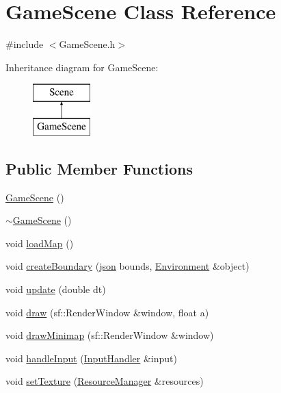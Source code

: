 \hypertarget{class_game_scene}{}\section{Game\+Scene Class Reference}
\label{class_game_scene}


{\ttfamily \#include $<$Game\+Scene.\+h$>$}

Inheritance diagram for Game\+Scene\+:\begin{figure}[H]
\begin{center}
\leavevmode
\includegraphics[height=2.000000cm]{class_game_scene}
\end{center}
\end{figure}
\subsection*{Public Member Functions}
\begin{DoxyCompactItemize}
\item 
\mbox{\hyperlink{class_game_scene_ac53cc300c8896048c0e21c67e49681b9}{Game\+Scene}} ()
\item 
\mbox{\hyperlink{class_game_scene_add5bc48c372aaa7f526c02558a8adf00}{$\sim$\+Game\+Scene}} ()
\item 
void \mbox{\hyperlink{class_game_scene_a0d8a4d922d430c42a6ee0381424ae822}{load\+Map}} ()
\item 
void \mbox{\hyperlink{class_game_scene_ab012fd64f76ebf2c329eee38cb1db5d8}{create\+Boundary}} (\mbox{\hyperlink{_level_loader_8h_ab701e3ac61a85b337ec5c1abaad6742d}{json}} bounds, \mbox{\hyperlink{class_environment}{Environment}} \&object)
\item 
void \mbox{\hyperlink{class_game_scene_a93d66fe7579e20d9476bc2cf51f73d82}{update}} (double dt)
\item 
void \mbox{\hyperlink{class_game_scene_a78f6d778b147a819ec89f77f3f9a5bc9}{draw}} (sf\+::\+Render\+Window \&window, float a)
\item 
void \mbox{\hyperlink{class_game_scene_a3dbfed573e480dcd17a28d6a3eddd3f8}{draw\+Minimap}} (sf\+::\+Render\+Window \&window)
\item 
void \mbox{\hyperlink{class_game_scene_a10042b36b1b586825ff8a37c47e38899}{handle\+Input}} (\mbox{\hyperlink{class_input_handler}{Input\+Handler}} \&input)
\item 
void \mbox{\hyperlink{class_game_scene_a8b0c074db0d7a7f89f029dd6d88d65e8}{set\+Texture}} (\mbox{\hyperlink{class_resource_manager}{Resource\+Manager}} \&resources)
\end{DoxyCompactItemize}


